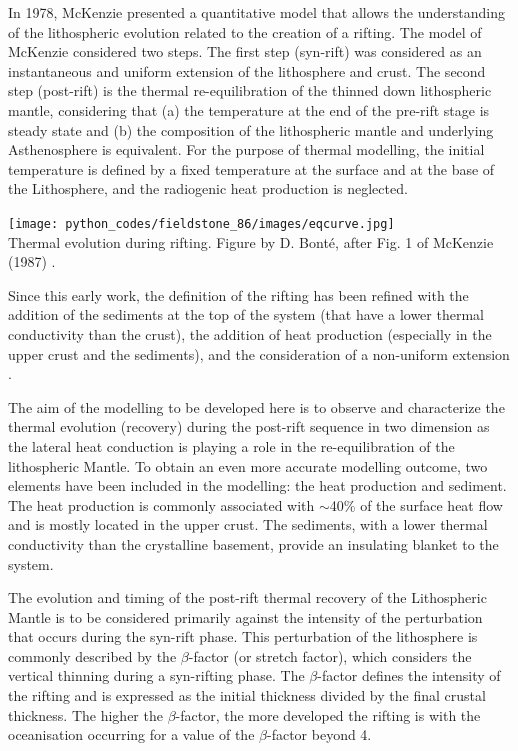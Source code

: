 In 1978, McKenzie presented a quantitative model \cite{mcke78} 
that allows the understanding of the lithospheric evolution related to the creation of a rifting. 
The model of McKenzie considered two steps. The first step (syn-rift) was considered as an 
instantaneous and uniform extension of the lithosphere and crust. The second step (post-rift) 
is the thermal re-equilibration of the thinned down lithospheric mantle, considering that 
(a) the temperature at the end of the pre-rift stage is steady state and (b) the composition 
of the lithospheric mantle and underlying Asthenosphere is equivalent. For the purpose of 
thermal modelling, the initial temperature is defined by a fixed temperature at the surface 
and at the base of the Lithosphere, and the radiogenic heat production is neglected.

\begin{center}
\texttt{[image: python\_codes/fieldstone\_86/images/eqcurve.jpg]}\\
{\captionfont Thermal evolution during rifting. 
Figure by D. Bont{\'e}, after Fig. 1 of McKenzie (1987) \cite{mcke78}.}
\end{center}

Since this early work, the definition of the rifting has been 
refined with the addition of the sediments at the top of the system 
(that have a lower thermal conductivity than the crust), 
the addition of heat production (especially in the upper crust and the sediments), 
and the consideration of a non-uniform extension \cite{roke80}.

The aim of the modelling to be developed here is to observe and characterize the thermal 
evolution (recovery) during the post-rift sequence in two dimension as the lateral heat 
conduction is playing a role in the re-equilibration of the lithospheric Mantle. To obtain 
an even more accurate modelling outcome, two elements have been included in the modelling: 
the heat production and sediment. The heat production is commonly associated with $\sim$40\% 
of the surface heat flow and is mostly located in the upper crust. The sediments, with a lower thermal 
conductivity than the crystalline basement, provide an insulating blanket to the system. 

The evolution and timing of the post-rift  thermal recovery of the Lithospheric Mantle 
is to be considered primarily against the intensity of the perturbation that occurs during 
the syn-rift phase. This perturbation of the lithosphere is commonly described by 
the $\beta$-factor (or stretch factor), which considers the vertical thinning during 
a syn-rifting phase. The $\beta$-factor defines the intensity of the rifting and 
is expressed as the initial thickness divided by the final crustal thickness. 
The higher the $\beta$-factor, the more developed the rifting is with the oceanisation 
occurring for a value of the $\beta$-factor beyond 4.

